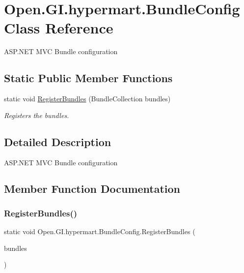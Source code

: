 \hypertarget{class_open_1_1_g_i_1_1hypermart_1_1_bundle_config}{}\section{Open.\+G\+I.\+hypermart.\+Bundle\+Config Class Reference}
\label{class_open_1_1_g_i_1_1hypermart_1_1_bundle_config}


A\+S\+P.\+N\+ET M\+VC Bundle configuration  


\subsection*{Static Public Member Functions}
\begin{DoxyCompactItemize}
\item 
static void \hyperlink{class_open_1_1_g_i_1_1hypermart_1_1_bundle_config_a7b372315a10361265239dc75c616207e}{Register\+Bundles} (Bundle\+Collection bundles)
\begin{DoxyCompactList}\small\item\em Registers the bundles. \end{DoxyCompactList}\end{DoxyCompactItemize}


\subsection{Detailed Description}
A\+S\+P.\+N\+ET M\+VC Bundle configuration 



\subsection{Member Function Documentation}
\hypertarget{class_open_1_1_g_i_1_1hypermart_1_1_bundle_config_a7b372315a10361265239dc75c616207e}{}\label{class_open_1_1_g_i_1_1hypermart_1_1_bundle_config_a7b372315a10361265239dc75c616207e} 
\subsubsection{\texorpdfstring{Register\+Bundles()}{RegisterBundles()}}
{\footnotesize\ttfamily static void Open.\+G\+I.\+hypermart.\+Bundle\+Config.\+Register\+Bundles (\begin{DoxyParamCaption}\item[{Bundle\+Collection}]{bundles }\end{DoxyParamCaption})\hspace{0.3cm}{\ttfamily [static]}}



